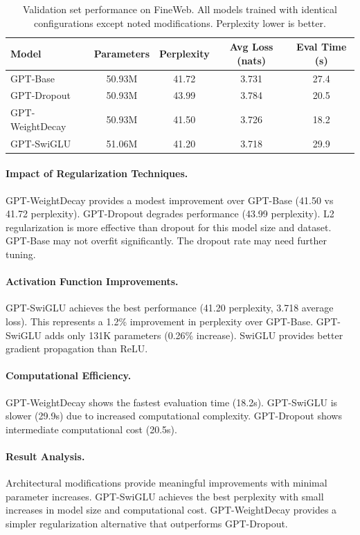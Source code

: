 \documentclass{article}
\begin{document}
\begin{table}[h]
\caption{Validation set performance on FineWeb. All models trained with identical configurations except noted modifications. Perplexity lower is better.}
\label{tab:results}
\centering
\begin{tabular}{lcccc}
\toprule
Model & Parameters & Perplexity & Avg Loss (nats) & Eval Time (s) \\
\midrule
GPT-Base & 50.93M & 41.72 & 3.731 & 27.4 \\
GPT-Dropout & 50.93M & 43.99 & 3.784 & 20.5 \\
GPT-WeightDecay & 50.93M & 41.50 & 3.726 & 18.2 \\
GPT-SwiGLU & 51.06M & 41.20 & 3.718 & 29.9 \\
\bottomrule
\end{tabular}
\end{table}

\paragraph{Impact of Regularization Techniques.} GPT-WeightDecay provides a modest improvement over GPT-Base (41.50 vs 41.72 perplexity). GPT-Dropout degrades performance (43.99 perplexity). L2 regularization is more effective than dropout for this model size and dataset. GPT-Base may not overfit significantly. The dropout rate may need further tuning.

\paragraph{Activation Function Improvements.} GPT-SwiGLU achieves the best performance (41.20 perplexity, 3.718 average loss). This represents a 1.2\% improvement in perplexity over GPT-Base. GPT-SwiGLU adds only 131K parameters (0.26\% increase). SwiGLU provides better gradient propagation than ReLU.

\paragraph{Computational Efficiency.} GPT-WeightDecay shows the fastest evaluation time (18.2s). GPT-SwiGLU is slower (29.9s) due to increased computational complexity. GPT-Dropout shows intermediate computational cost (20.5s).

\paragraph{Result Analysis.} Architectural modifications provide meaningful improvements with minimal parameter increases. GPT-SwiGLU achieves the best perplexity with small increases in model size and computational cost. GPT-WeightDecay provides a simpler regularization alternative that outperforms GPT-Dropout.
\end{document}
